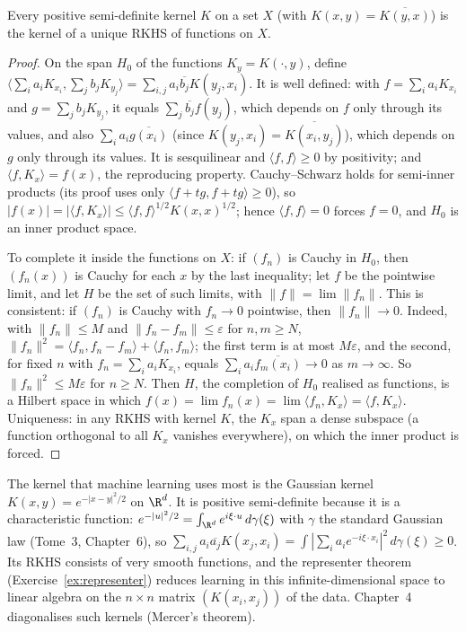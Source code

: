 \begin{theorem}\label{thm:aronszajn}
Every positive semi-definite kernel $K$ on a set $X$ (with $K(x,y)=\overline{K(y,x)}$) is the kernel of a unique RKHS of functions on $X$.
\end{theorem}
\begin{proof}
On the span $H_0$ of the functions $K_y=K(\cdot,y)$, define $\langle\sum_ia_iK_{x_i},\sum_jb_jK_{y_j}\rangle=\sum_{i,j}a_i\overline{b_j}K(y_j,x_i)$. It is well defined: with $f=\sum_ia_iK_{x_i}$ and $g=\sum_jb_jK_{y_j}$, it equals
$\sum_j\overline{b_j}f(y_j)$, which depends on $f$ only through its values, and also $\sum_ia_i\overline{g(x_i)}$ (since $K(y_j,x_i)=\overline{K(x_i,y_j)}$), which depends on $g$ only through its values. It is sesquilinear and $\langle f,f\rangle\ge0$ by positivity; and $\langle f,K_x\rangle=f(x)$, the
reproducing property. Cauchy--Schwarz holds for semi-inner products (its proof uses only $\langle f+tg,f+tg\rangle\ge0$), so $|f(x)|=|\langle f,K_x\rangle|\le\langle f,f\rangle^{1/2}K(x,x)^{1/2}$; hence $\langle f,f\rangle=0$ forces $f=0$, and
$H_0$ is an inner product space.

To complete it inside the functions on $X$: if $(f_n)$ is Cauchy in $H_0$, then $(f_n(x))$ is Cauchy for each $x$ by the last inequality; let $f$ be the pointwise limit, and let $H$ be the set of such limits, with
$\|f\|=\lim\|f_n\|$. This is consistent: if $(f_n)$ is Cauchy with $f_n\to0$ pointwise, then $\|f_n\|\to0$. Indeed, with $\|f_n\|\le M$ and $\|f_n-f_m\|\le\varepsilon$ for $n,m\ge N$,
$\|f_n\|^2=\langle f_n,f_n-f_m\rangle+\langle f_n,f_m\rangle$; the first term is at most $M\varepsilon$, and the second, for fixed $n$ with $f_n=\sum_ia_iK_{x_i}$, equals $\sum_ia_i\overline{f_m(x_i)}\to0$ as $m\to\infty$. So
$\|f_n\|^2\le M\varepsilon$ for $n\ge N$. Then $H$, the completion of $H_0$ realised as functions, is a Hilbert space in which $f(x)=\lim f_n(x)=\lim\langle f_n,K_x\rangle=\langle f,K_x\rangle$. Uniqueness: in any RKHS with kernel $K$, the $K_x$
span a dense subspace (a function orthogonal to all $K_x$ vanishes everywhere), on which the inner product is forced.
\end{proof}

The kernel that machine learning uses most is the Gaussian kernel $K(x,y)=e^{-|x-y|^2/2}$ on $\R^d$. It is positive semi-definite because it is a characteristic function: $e^{-|u|^2/2}=\int_{\R^d}e^{i\xi\cdot u}\,d\gamma(\xi)$ with $\gamma$
the standard Gaussian law (Tome~3, Chapter~6), so $\sum_{i,j}a_i\overline{a_j}K(x_j,x_i)=\int|\sum_ia_ie^{-i\xi\cdot x_i}|^2\,d\gamma(\xi)\ge0$. Its RKHS consists of very smooth functions, and the representer theorem
(Exercise~\ref{ex:representer}) reduces learning in this infinite-dimensional space to linear algebra on the $n\times n$ matrix $(K(x_i,x_j))$ of the data. Chapter~4 diagonalises such kernels (Mercer's theorem).

